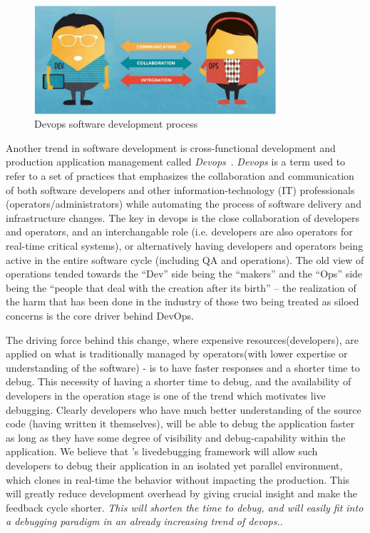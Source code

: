\begin{figure}[h!]
	\begin{center}
		\includegraphics[width=0.8\textwidth]{guided/figs/devops.pdf}
		\caption{Devops software development process}
		\label{fig:devops}
	\end{center}
\end{figure}

Another trend in software development is cross-functional development and production application management called \emph{Devops}~\cite{10DevOps}.
\emph{Devops} is a term used to refer to a set of practices that emphasizes the collaboration and communication of both software developers and other information-technology (IT) professionals (operators/administrators) while automating the process of software delivery and infrastructure changes.
The key in devops is the close collaboration of developers and operators, and an interchangable role (i.e. developers are also operators for real-time critical systems), or alternatively having developers and operators being active in the entire software cycle (including QA and operations).
The old view of operations tended towards the “Dev” side being the “makers” and the “Ops” side being the “people that deal with the creation after its birth” – the realization of the harm that has been done in the industry of those two being treated as siloed concerns is the core driver behind DevOps.

The driving force behind this change, where expensive resources(developers), are applied on what is traditionally managed by operators(with lower expertise or understanding of the software) - is to have faster responses and a shorter time to debug.
This necessity of having a shorter time to debug, and the availability of developers in the operation stage is one of the trend which motivates live debugging. 
Clearly developers who have much better understanding of the source code (having written it themselves), will be able to debug the application faster as long as they have some degree of visibility and debug-capability within the application.
We believe that \parikshan's livedebugging framework will allow such developers to debug their application in an isolated yet parallel environment, which clones in real-time the behavior without impacting the production.
This will greatly reduce development overhead by giving crucial insight and make the feedback cycle shorter.
\emph{This will shorten the time to debug, and will easily fit into a debugging paradigm in an already increasing trend of devops.}.


